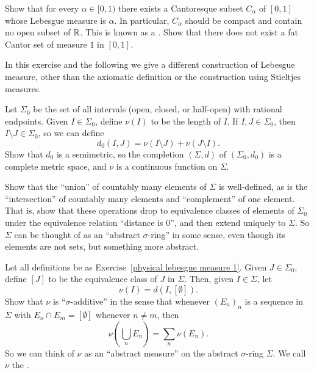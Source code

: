 \begin{exercise}\label{fat cat}
Show that for every $\alpha \in [0, 1)$ there exists a Cantoresque subset $C_{\alpha}$ of $[0, 1]$ whose Lebesgue measure is $\alpha$.
In particular, $C_{\alpha}$ should be compact and contain no open subset of $\mathbb{R}$.
This is known as a .
Show that there does not exist a fat Cantor set of measure $1$ in $[0, 1]$.
\end{exercise}

\begin{exercise}\label{physical lebesgue measure 1}
In this exercise and the following we give a different construction of Lebesgue measure, other than the axiomatic definition or the construction using Stieltjes measures.

Let $\Sigma_{0}$ be the set of all intervals (open, closed, or half-open) with rational endpoints.
Given $I \in \Sigma_{0}$, define $\nu(I)$ to be the length of $I$.
If $I, J \in \Sigma_{0}$, then $I \setminus J \in \Sigma_{0}$, so we can define
\[d_{0}(I, J) = \nu(I \setminus J) + \nu(J \setminus I).\]
Show that $d_{0}$ is a semimetric, so the completion $(\Sigma, d)$ of $(\Sigma_{0}, d_{0})$ is a complete metric space, and $\nu$ is a continuous function on $\Sigma$.

Show that the ``union'' of countably many elements of $\Sigma$ is well-defined, as is the ``intersection'' of countably many elements and ``complement'' of one element.
That is, show that these operations drop to equivalence classes of elements of $\Sigma_{0}$ under the equivalence relation ``distance is $0$'', and then extend uniquely to $\Sigma$.
So $\Sigma$ can be thought of as an ``abstract $\sigma$-ring'' in some sense, even though its elements are not sets, but something more abstract.
\end{exercise}

\begin{exercise}\label{physical lebesgue measure 2}
Let all definitions be as Exercise~\ref{physical lebesgue measure 1}.
Given $J \in \Sigma_{0}$, define $[J]$ to be the equivalence class of $J$ in $\Sigma$.
Then, given $I \in \Sigma$, let
\[\nu(I) = d(I, [\emptyset]).\]
Show that $\nu$ is ``$\sigma$-additive'' in the sense that whenever ${(E_{n})}_{n}$ is a sequence in $\Sigma$ with $E_{n} \cap E_{m} = [\emptyset]$ whenever $n \neq m$, then
\[\nu\left(\bigcup_{n} E_{n}\right) = \sum_{n} \nu(E_{n}).\]
So we can think of $\nu$ as an ``abstract measure'' on the abstract $\sigma$-ring $\Sigma$.
We call $\nu$ the .
\end{exercise}

